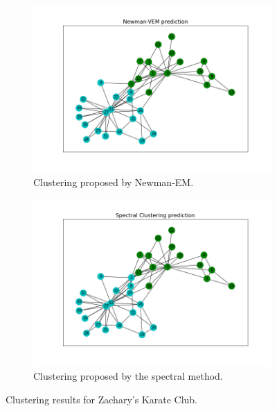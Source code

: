 \documentclass[switch, 12pt]{article}
\begin{document}
\begin{figure}[h]
    \medskip

    \begin{subfigure}{0.42\linewidth}
        \centering
        \includegraphics[width=\linewidth, trim={45 35 35 60}, clip]{figures/karate_club_newman.png}
        \caption{Clustering proposed by Newman-EM.}
        \label{fig:zachary_newman}
    \end{subfigure}
    \hspace{1em}
    \begin{subfigure}{0.42\linewidth}
        \centering
        \includegraphics[width=\linewidth, trim={45 35 35 60}, clip]{figures/karate_club_spectral.png}
        \caption{Clustering proposed by the spectral method.}
        \label{fig:zachary_spectral}
    \end{subfigure}
    \caption{Clustering results for Zachary's Karate Club.}
    \label{fig:zachary_results}
\end{figure}
\end{document}
